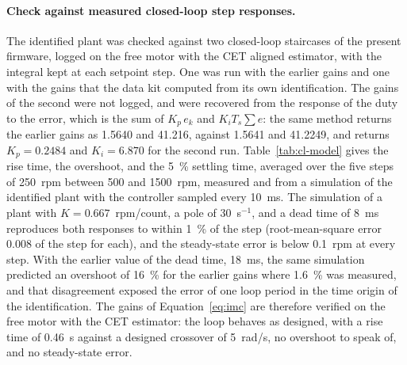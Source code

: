 \paragraph{Check against measured closed-loop step responses.}
The identified plant was checked against two closed-loop staircases of the present firmware, logged on the free motor with the CET aligned estimator, with the integral kept at each setpoint step. One was run with the earlier gains and one with the gains that the data kit computed from its own identification. The gains of the second were not logged, and were recovered from the response of the duty to the error, which is the sum of $K_p\, e_k$ and $K_i T_s \sum e$: the same method returns the earlier gains as 1.5640 and 41.216, against 1.5641 and 41.2249, and returns $K_p = 0.2484$ and $K_i = 6.870$ for the second run. Table~\ref{tab:cl-model} gives the rise time, the overshoot, and the 5~\% settling time, averaged over the five steps of 250~rpm between 500 and 1500~rpm, measured and from a simulation of the identified plant with the controller sampled every 10~ms. The simulation of a plant with $K = 0.667$~rpm/count, a pole of 30~s$^{-1}$, and a dead time of 8~ms reproduces both responses to within 1~\% of the step (root-mean-square error 0.008 of the step for each), and the steady-state error is below 0.1~rpm at every step. With the earlier value of the dead time, 18~ms, the same simulation predicted an overshoot of 16~\% for the earlier gains where 1.6~\% was measured, and that disagreement exposed the error of one loop period in the time origin of the identification. The gains of Equation~\ref{eq:imc} are therefore verified on the free motor with the CET estimator: the loop behaves as designed, with a rise time of 0.46~s against a designed crossover of 5~rad/s, no overshoot to speak of, and no steady-state error.

\begin{table}[htbp]
    \centering
    \caption[Measured and simulated closed-loop step response]{Closed-loop step response of the free motor with the CET aligned estimator, measured and simulated, averaged over five steps of 250~rpm from 500 to 1500~rpm. The log has a resolution of 10~ms, which is the resolution of the rise times. Single repeat.}
    \label{tab:cl-model}
    \small
\end{table}

